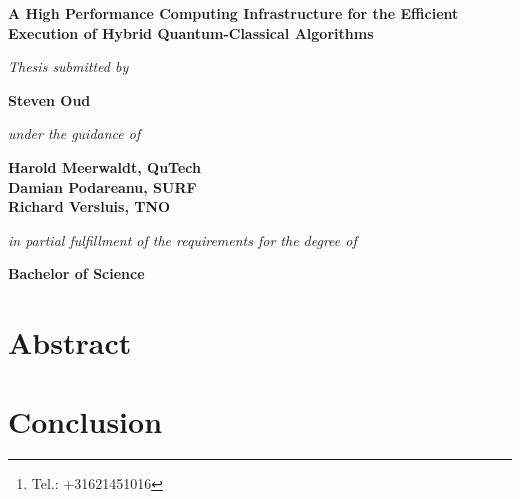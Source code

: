 \documentclass[a4paper,11pt]{report}
\title{\thesistitle}
\author{\authorname\thanks{Tel.: +31621451016}\\
    500776959\\
    \\
    \emph{Faculty of Computer Science, Information Technology,}\\
    \emph{Business IT and Management}\\
    Software Engineering
    \\
    \\
    \\
    Advisor: Marten Teitsma
    \\
    \\
    \\
    Amsterdam University of Applied Sciences\\
    \today}
\date{}
\renewcommand{\thefootnote}{\fnsymbol{footnote}}
\newcommand{\thesistitle}{A High Performance Computing Infrastructure for the Efficient Execution of Hybrid Quantum-Classical Algorithms}
\newcommand{\authorname}{Steven Oud}
\begin{document}
\begin{titlepage}
\thispagestyle{empty}
    \begin{center}
        \vspace*{1cm}
        \textbf{\LARGE \thesistitle}
        
        \vspace{1.5cm}
        \textit{\large Thesis submitted by}

        \vspace{0.75cm}
        
        \textbf{\large \authorname}
        
        \vspace{0.75cm}
        \textit{\large under the guidance of}
        
        \vspace{0.75cm}
        \textbf{\large Harold Meerwaldt, QuTech\\
            Damian Podareanu, SURF\\
            Richard Versluis, TNO}
        
        \vspace{0.75cm}
        \textit{\large in partial fulfillment of the requirements for the degree of}
        
        \vspace{0.75cm}
        \textbf{\large Bachelor of Science}
        
    \end{center}
\end{titlepage}

\maketitle

\renewcommand{\thefootnote}{\arabic{footnote}}

\chapter*{Abstract}
\lipsum[5]

\cleardoublepage
\tableofcontents

\cleardoublepage
\listoffigures

\cleardoublepage
\listoftables

\cleardoublepage
{}









\chapter{Conclusion}

\cleardoublepage
\printbibliography[heading=bibintoc]

\cleardoublepage
\printnoidxglossaries
\end{document}
